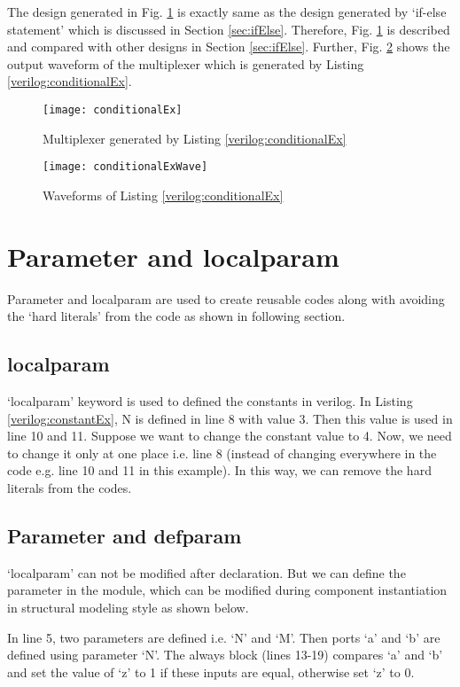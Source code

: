 The design generated in Fig. \ref{fig:conditionalEx} is exactly same as the design generated by `if-else statement' which is discussed in Section \ref{sec:ifElse}. Therefore, Fig. \ref{fig:conditionalEx} is described and compared with other designs in Section \ref{sec:ifElse}. Further, Fig. \ref{fig:conditionalExWave} shows the output waveform of the multiplexer which is generated by Listing \ref{verilog:conditionalEx}. 
\begin{figure}
	\centering
	\texttt{[image: conditionalEx]}
	\caption{Multiplexer generated by Listing \ref{verilog:conditionalEx}}
	\label{fig:conditionalEx}
\end{figure}
\begin{figure}
	\centering
	\texttt{[image: conditionalExWave]}
	\caption{Waveforms of Listing \ref{verilog:conditionalEx}}
	\label{fig:conditionalExWave}
\end{figure}
\section{Parameter and localparam}
Parameter and localparam are used to create reusable codes along with avoiding the `hard literals' from the code as shown in following section. 

\subsection{localparam}
`localparam' keyword is used to defined the constants in verilog. In Listing \ref{verilog:constantEx}, N is defined in line 8 with value 3. Then this value is used in line 10 and 11. Suppose we want to change the constant value to 4. Now, we need to change it only at one place i.e. line 8 (instead of changing everywhere in the code e.g. line 10 and 11 in this example). In this way, we can remove the hard literals from the codes. 



\subsection{Parameter and defparam}
`localparam' can not be modified after declaration. But we can define the parameter in the module, which can be modified during component instantiation in structural modeling style as shown below.

\begin{explanation}
	In line 5, two parameters are defined i.e. `N' and `M'. Then ports `a' and `b' are defined using parameter `N'. The always block (lines 13-19) compares `a' and `b' and set the value of `z' to 1 if these inputs are equal, otherwise set `z' to 0. 
\end{explanation}


